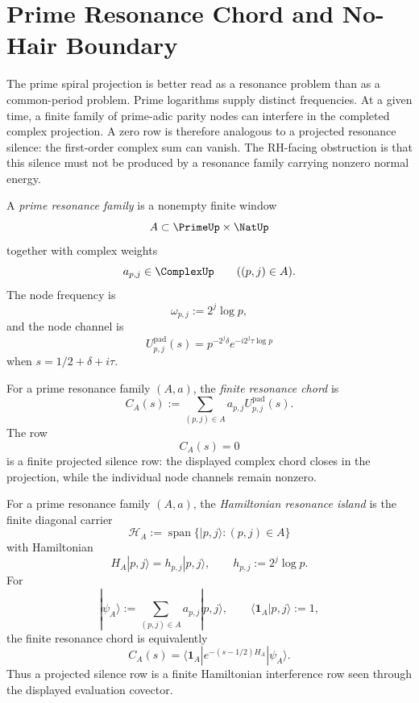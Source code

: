 \section{Prime Resonance Chord and No-Hair Boundary}
\label{sec:unified-reality-prime-resonance-chord-no-hair}

The prime spiral projection is better read as a resonance problem than
as a common-period problem.  Prime logarithms supply distinct frequencies.
At a given time, a finite family of prime-adic parity nodes can interfere
in the completed complex projection.  A zero row is therefore analogous
to a projected resonance silence: the first-order complex sum can vanish.
The RH-facing obstruction is that this silence must not be produced by a
resonance family carrying nonzero normal energy.

\begin{definition}
\label{def:unified-reality-prime-resonance-family}
A \emph{prime resonance family} is a nonempty finite window
$$
A\subset\PrimeUp\times\NatUp
$$
together with complex weights
$$
a_{p,j}\in\ComplexUp
\qquad
((p,j)\in A).
$$
The node frequency is
$$
\omega_{p,j}:=2^j\log p,
$$
and the node channel is
$$
U_{p,j}^{\mathrm{pad}}(s)
=
p^{-2^j\delta}e^{-i2^j\tau\log p}
$$
when $s=1/2+\delta+i\tau$.
\end{definition}

\begin{definition}
\label{def:unified-reality-finite-resonance-chord}
For a prime resonance family $(A,a)$, the \emph{finite resonance chord}
is
$$
C_A(s)
:=
\sum_{(p,j)\in A}
a_{p,j}U_{p,j}^{\mathrm{pad}}(s).
$$
The row
$$
C_A(s)=0
$$
is a finite projected silence row: the displayed complex chord closes in
the projection, while the individual node channels remain nonzero.
\end{definition}

\begin{definition}
\label{def:unified-reality-hamiltonian-resonance-island}
For a prime resonance family $(A,a)$, the \emph{Hamiltonian resonance
island} is the finite diagonal carrier
$$
\mathcal H_A
:=
\operatorname{span}\{|p,j\rangle:(p,j)\in A\}
$$
with Hamiltonian
$$
H_A|p,j\rangle
=
h_{p,j}|p,j\rangle,
\qquad
h_{p,j}:=2^j\log p.
$$
For
$$
|\psi_A\rangle
:=
\sum_{(p,j)\in A}a_{p,j}|p,j\rangle,
\qquad
\langle\mathbf 1_A|p,j\rangle:=1,
$$
the finite resonance chord is equivalently
$$
C_A(s)
=
\langle\mathbf 1_A|
e^{-(s-1/2)H_A}
|\psi_A\rangle.
$$
Thus a projected silence row is a finite Hamiltonian interference row
seen through the displayed evaluation covector.
\end{definition}

